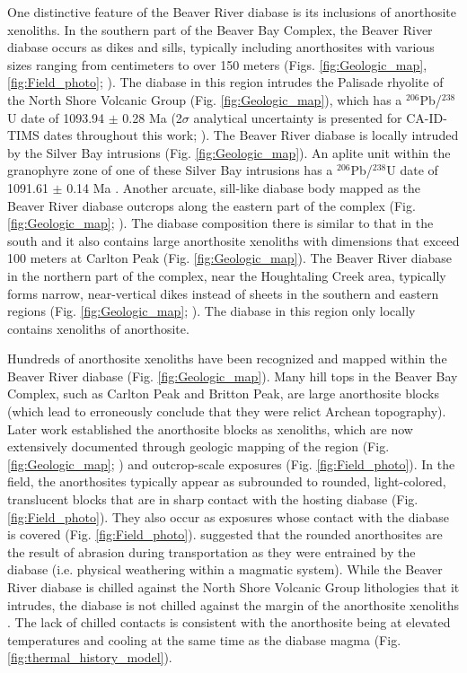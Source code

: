 One distinctive feature of the Beaver River diabase is its inclusions of anorthosite xenoliths. In the southern part of the Beaver Bay Complex, the Beaver River diabase occurs as dikes and sills, typically including anorthosites with various sizes ranging from centimeters to over 150 meters (Figs. \ref{fig:Geologic_map}, \ref{fig:Field_photo}; ). The diabase in this region intrudes the Palisade rhyolite of the North Shore Volcanic Group (Fig. \ref{fig:Geologic_map}), which has a $^{206}$Pb/$^{238}$U date of 1093.94 $\pm$ 0.28 Ma (2$\sigma$ analytical uncertainty is presented for CA-ID-TIMS dates throughout this work; ). The Beaver River diabase is locally intruded by the Silver Bay intrusions (Fig. \ref{fig:Geologic_map}). An aplite unit within the granophyre zone of one of these Silver Bay intrusions has a $^{206}$Pb/$^{238}$U date of 1091.61 $\pm$ 0.14 Ma \cite{Swanson-Hysell2019a}. Another arcuate, sill-like diabase body mapped as the Beaver River diabase outcrops along the eastern part of the complex (Fig. \ref{fig:Geologic_map}; ). The diabase composition there is similar to that in the south and it also contains large anorthosite xenoliths with dimensions that exceed 100 meters at Carlton Peak (Fig. \ref{fig:Geologic_map}). The Beaver River diabase in the northern part of the complex, near the Houghtaling Creek area, typically forms narrow, near-vertical dikes instead of sheets in the southern and eastern regions (Fig. \ref{fig:Geologic_map}; ). The diabase in this region only locally contains xenoliths of anorthosite. 

Hundreds of anorthosite xenoliths have been recognized and mapped within the Beaver River diabase (Fig. \ref{fig:Geologic_map}). Many hill tops in the Beaver Bay Complex, such as Carlton Peak and Britton Peak, are large anorthosite blocks (which lead  to erroneously conclude that they were relict Archean topography). Later work established the anorthosite blocks as xenoliths, which are now extensively documented through geologic mapping of the region (Fig. \ref{fig:Geologic_map}; ) and outcrop-scale exposures (Fig. \ref{fig:Field_photo}). In the field, the anorthosites typically appear as subrounded to rounded, light-colored, translucent blocks that are in sharp contact with the hosting diabase (Fig. \ref{fig:Field_photo}). They also occur as exposures whose contact with the diabase is covered (Fig. \ref{fig:Field_photo}).  suggested that the rounded anorthosites are the result of abrasion during transportation as they were entrained by the diabase (i.e. physical weathering within a magmatic system). While the Beaver River diabase is chilled against the North Shore Volcanic Group lithologies that it intrudes, the diabase is not chilled against the margin of the anorthosite xenoliths \cite{Morrison1983a, Miller1997a}. The lack of chilled contacts is consistent with the anorthosite being at elevated temperatures and cooling at the same time as the diabase magma (Fig. \ref{fig:thermal_history_model}).


